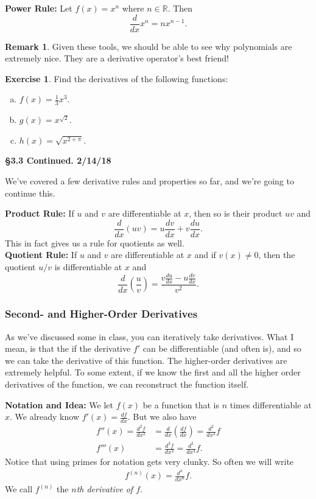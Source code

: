 \documentclass[leqno]{article}
\theoremstyle{definition}
\newtheorem{remark}{Remark}[section]
\newtheorem{exercise}{Exercise}[section]
\theoremstyle{remark}
\theoremstyle{theorem}
\newcommand{\R}{\mathbb{R}}
\begin{document}
\noindent \textbf{Power Rule:} Let $f(x)=x^n$ where $n\in \R$.  Then
\[
\frac{d}{dx}x^n=nx^{n-1}.
\]

\begin{remark}
Given these tools, we should be able to see why polynomials are extremely nice.  They are a derivative operator's best friend!
\end{remark}

\begin{exercise}
Find the derivatives of the following functions:
\begin{enumerate}[(a)]
\item $f(x)=\frac{1}{3}x^3$.
\item $g(x)=x^{\sqrt{2}}$.
\item $h(x)=\sqrt{x^{2+\pi}}$.
\end{enumerate}
\vspace*{8cm}
\end{exercise}


\noindent \textbf{\Large{\S 3.3 Continued.  2/14/18}}

We've covered a few derivative rules and properties so far, and we're going to continue this.  

\noindent \textbf{Product Rule:} If $u$ and $v$ are differentiable at $x$, then so is their product $uv$ and
\[
\frac{d}{dx}(uv)=u\frac{dv}{dx}+v\frac{du}{dx}.
\]
This in fact gives us a rule for quotients as well.  \\

\noindent \textbf{Quotient Rule:} If $u$ and $v$ are differentiable at $x$ and if $v(x)\neq 0$, then the quotient $u/v$ is differentiable at $x$ and
\[
\frac{d}{dx}\left(\frac{u}{v}\right) = \frac{v\frac{du}{dx}-u\frac{dv}{dx}}{v^2}.
\]

\subsubsection{Second- and Higher-Order Derivatives}

As we've discussed some in class, you can iteratively take derivatives.  What I mean, is that the if the derivative $f'$ can be differentiable (and often is), and so we can take the derivative of this function.  The higher-order derivatives are extremely helpful.  To some extent, if we know the first and all the higher order derivatives of the function, we can reconstruct the function itself. 

\noindent \textbf{Notation and Idea:} We let $f(x)$ be a function that is $n$ times differentiable at $x$.  We already know $f'(x)=\frac{df}{dx}$.  But we also have
\begin{align*}
f''(x)=\frac{d^2f}{dx^2}&=\frac{d}{dx}\left( \frac{df}{dx} \right)= \frac{d^2}{dx^2}f\\
f'''(x)&=\frac{d^3f}{dx^3}=\frac{d^3}{dx^3}f.
\end{align*}
Notice that using primes for notation gets very clunky.  So often we will write
\begin{align*}
f^(n)(x)=\frac{d^n}{dx^n}f.
\end{align*}
We call $f^(n)$ the \emph{$n$th derivative of $f$}.
\end{document}

